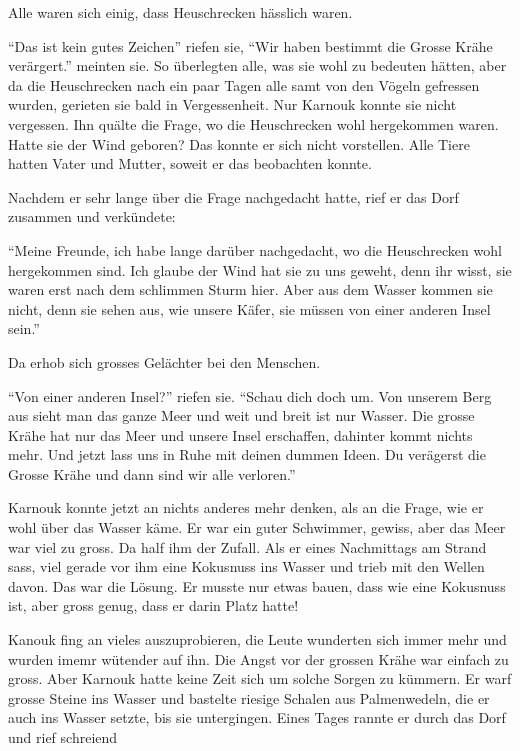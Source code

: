 Alle waren sich einig, dass Heuschrecken hässlich waren. 

\enquote{Das ist kein gutes Zeichen} riefen sie, \enquote{Wir haben bestimmt die Grosse Krähe verärgert.} meinten sie. So überlegten alle, was sie wohl zu bedeuten hätten, aber da die Heuschrecken nach ein paar Tagen alle samt von den Vögeln gefressen wurden, gerieten sie bald in Vergessenheit. Nur Karnouk konnte sie nicht vergessen. Ihn quälte die Frage, wo die Heuschrecken wohl hergekommen waren. Hatte sie der Wind geboren? Das konnte er sich nicht vorstellen. Alle Tiere hatten Vater und Mutter, soweit er das beobachten konnte. 

Nachdem er sehr lange über die Frage nachgedacht hatte, rief er das Dorf zusammen und verkündete:

\enquote{Meine Freunde, ich habe lange darüber nachgedacht, wo die Heuschrecken wohl hergekommen sind. Ich glaube der Wind hat sie zu uns geweht, denn ihr wisst, sie waren erst nach dem schlimmen Sturm hier. Aber aus dem Wasser kommen sie nicht, denn sie sehen aus, wie unsere Käfer, sie müssen von einer anderen Insel sein.}

Da erhob sich grosses Gelächter bei den Menschen.

\enquote{Von einer anderen Insel?} riefen sie. \enquote{Schau dich doch um. Von unserem Berg aus sieht man das ganze Meer und weit und breit ist nur Wasser. Die grosse Krähe hat nur das Meer und unsere Insel erschaffen, dahinter kommt nichts mehr. Und jetzt lass uns in Ruhe mit deinen dummen Ideen. Du verägerst die Grosse Krähe und dann sind wir alle verloren.}

Karnouk konnte jetzt an nichts anderes mehr denken, als an die Frage, wie er wohl über das Wasser käme. Er war ein guter Schwimmer, gewiss, aber das Meer war viel zu gross. Da half ihm der Zufall. Als er eines Nachmittags am Strand sass, viel gerade vor ihm eine Kokusnuss ins Wasser und trieb mit den Wellen davon. Das war die Lösung. Er musste nur etwas bauen, dass wie eine Kokusnuss ist, aber gross genug, dass er darin Platz hatte!

Kanouk fing an vieles auszuprobieren, die Leute wunderten sich immer mehr und wurden imemr wütender auf ihn. Die Angst vor der grossen Krähe war einfach zu gross. Aber Karnouk hatte keine Zeit sich um solche Sorgen zu kümmern. Er warf grosse Steine ins Wasser und bastelte riesige Schalen aus Palmenwedeln, die er auch ins Wasser setzte, bis sie untergingen. Eines Tages rannte er durch das Dorf und rief schreiend 

